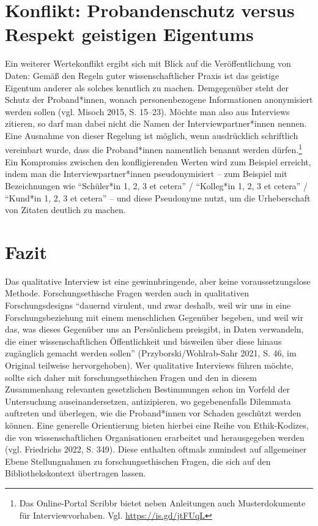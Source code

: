 \documentclass[a4paper,
fontsize=11pt,
oneside,
numbers=noperiodatend,
parskip=half-,
bibliography=totoc,
final
]{scrartcl}
\begin{document}
\section{Konflikt: Probandenschutz versus Respekt geistigen
Eigentums}\label{konflikt-probandenschutz-versus-respekt-geistigen-eigentums}

Ein weiterer Wertekonflikt ergibt sich mit Blick auf die
Veröffentlichung von Daten: Gemäß den Regeln guter wissenschaftlicher
Praxis ist das geistige Eigentum anderer als solches kenntlich zu
machen. Demgegenüber steht der Schutz der Proband*innen, wonach
personenbezogene Informationen anonymisiert werden sollen (vgl. Misoch
2015, S. 15--23). Möchte man also aus Interviews zitieren, so darf man
dabei nicht die Namen der Interviewpartner*innen nennen. Eine Ausnahme
von dieser Regelung ist möglich, wenn ausdrücklich schriftlich
vereinbart wurde, dass die Proband*innen namentlich benannt werden
dürfen.\footnote{Das Online-Portal Scribbr bietet neben Anleitungen auch
  Musterdokumente für Interviewvorhaben. Vgl. \url{https://is.gd/jtFUqL}}
Ein Kompromiss zwischen den konfligierenden Werten wird zum Beispiel
erreicht, indem man die Interviewpartner*innen pseudonymisiert -- zum
Beispiel mit Bezeichnungen wie \enquote{Schüler*in 1, 2, 3 et cetera} /
\enquote{Kolleg*in 1, 2, 3 et cetera} / \enquote{Kund*in 1, 2, 3 et
cetera} -- und diese Pseudonyme nutzt, um die Urheberschaft von Zitaten
deutlich zu machen.

\section{Fazit}\label{fazit}

Das qualitative Interview ist eine gewinnbringende, aber keine
voraussetzungslose Methode. Forschungsethische Fragen werden auch in
qualitativen Forschungsdesigns \enquote{dauernd virulent, und zwar
deshalb, weil wir uns in eine Forschungsbeziehung mit einem menschlichen
Gegenüber begeben, und weil wir das, was dieses Gegenüber uns an
Persönlichem preisgibt, in Daten verwandeln, die einer
wissenschaftlichen Öffentlichkeit und bisweilen über diese hinaus
zugänglich gemacht werden sollen} (Przyborski/Wohlrab-Sahr 2021, S. 46,
im Original teilweise hervorgehoben). Wer qualitative Interviews führen
möchte, sollte sich daher mit forschungsethischen Fragen und den in
diesem Zusammenhang relevanten gesetzlichen Bestimmungen schon im
Vorfeld der Untersuchung auseinandersetzen, antizipieren, wo
gegebenenfalls Dilemmata auftreten und überlegen, wie die Proband*innen
vor Schaden geschützt werden können. Eine generelle Orientierung bieten
hierbei eine Reihe von Ethik-Kodizes, die von wissenschaftlichen
Organisationen erarbeitet und herausgegeben werden (vgl. Friedrichs
2022, S. 349). Diese enthalten oftmals zumindest auf allgemeiner Ebene
Stellungnahmen zu forschungsethischen Fragen, die sich auf den
Bibliothekskontext übertragen lassen.
\end{document}
